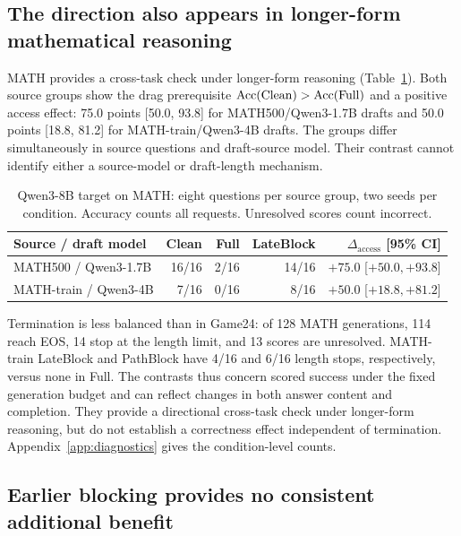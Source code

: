 \documentclass{article}
\newcommand{\fullaccess}{\ifmmode\mathrm{Full}\else\textup{Full}\fi}
\newcommand{\lateblock}{\ifmmode\mathrm{LateBlock}\else\textup{LateBlock}\fi}
\newcommand{\pathblock}{\ifmmode\mathrm{PathBlock}\else\textup{PathBlock}\fi}
\newcommand{\clean}{\ifmmode\mathrm{Clean}\else\textup{Clean}\fi}
\begin{document}
\subsection{The direction also appears in longer-form mathematical reasoning}
\label{sec:math-replication}

MATH provides a cross-task check under longer-form reasoning (Table~\ref{tab:math}). Both source groups show the drag prerequisite $\operatorname{Acc}(\clean{})>\operatorname{Acc}(\fullaccess{})$ and a positive access effect: 75.0 points [50.0, 93.8] for MATH500/Qwen3-1.7B drafts and 50.0 points [18.8, 81.2] for MATH-train/Qwen3-4B drafts. The groups differ simultaneously in source questions and draft-source model. Their contrast cannot identify either a source-model or draft-length mechanism.

\begin{table}[t]
\caption{Qwen3-8B target on MATH: eight questions per source group, two seeds per condition. Accuracy counts all requests. Unresolved scores count incorrect.}
\label{tab:math}
\centering
\begin{tabular}{lrrrr}
\toprule
Source / draft model & \clean{} & \fullaccess{} & \lateblock{} & $\Delta_{\mathrm{access}}$ [95\% CI] \\
\midrule
MATH500 / Qwen3-1.7B & 16/16 & 2/16 & 14/16 & $+75.0$ [$+50.0,+93.8$] \\
MATH-train / Qwen3-4B & 7/16 & 0/16 & 8/16 & $+50.0$ [$+18.8,+81.2$] \\
\bottomrule
\end{tabular}
\end{table}

Termination is less balanced than in Game24: of 128 MATH generations, 114 reach EOS, 14 stop at the length limit, and 13 scores are unresolved. MATH-train \lateblock{} and \pathblock{} have 4/16 and 6/16 length stops, respectively, versus none in \fullaccess{}. The contrasts thus concern scored success under the fixed generation budget and can reflect changes in both answer content and completion. They provide a directional cross-task check under longer-form reasoning, but do not establish a correctness effect independent of termination. Appendix~\ref{app:diagnostics} gives the condition-level counts.

\subsection{Earlier blocking provides no consistent additional benefit}
\label{sec:timing}
\end{document}
